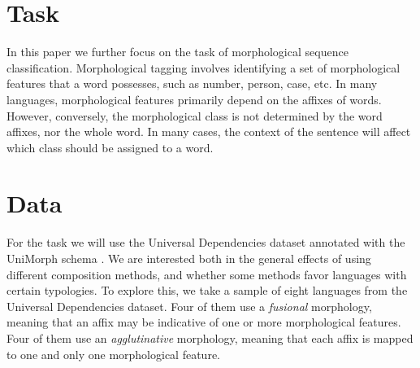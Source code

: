 \documentclass[11pt]{article}
\begin{document}
    

    \section{Task}
             In this paper we further focus on the task of
     morphological sequence classification. Morphological tagging
     involves identifying a set of morphological features that a word
     possesses, such as number, person, case, etc. In many languages,
     morphological features primarily depend on the affixes of
     words. However, conversely, the morphological class is not
     determined by the word affixes, nor the whole word. In many
     cases, the context of the sentence will affect which class should
     be assigned to a word.

    \section{Data}
    
        For the task we will use the Universal Dependencies dataset
     \cite{nivre2018} annotated with the UniMorph schema
     \cite{mccarthy2018marrying}. We are interested both in the
     general effects of using different composition methods, and
     whether some methods favor languages with certain typologies. To
     explore this, we take a sample of eight languages from the
     Universal Dependencies dataset. Four of them use a
     \textit{fusional} morphology, meaning that an affix may be
     indicative of one or more morphological features. Four of them
     use an \textit{agglutinative} morphology, meaning that each affix
     is mapped to one and only one morphological feature.
\end{document}
